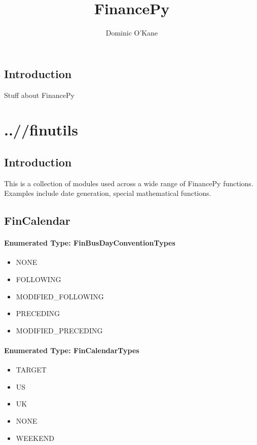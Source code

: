 \documentclass[twoside,11pt]{book}
\begin{document}
\title{{\Huge \bf FinancePy}}
\author{Dominic O'Kane}

\maketitle 

\cleardoublepage

\setcounter{tocdepth}{1}
\tableofcontents

\setcounter{page}{1}

\section{Introduction}
Stuff about FinancePy
\chapter{..//finutils}
\section{Introduction}
This is a collection of modules used across a wide range of FinancePy functions. Examples include date generation, special mathematical functions.
\newpage
\section{FinCalendar}

\subsubsection{Enumerated Type: FinBusDayConventionTypes}
\begin{itemize}
\item{NONE}
\item{FOLLOWING}
\item{MODIFIED\_FOLLOWING}
\item{PRECEDING}
\item{MODIFIED\_PRECEDING}
\end{itemize}

\subsubsection{Enumerated Type: FinCalendarTypes}
\begin{itemize}
\item{TARGET}
\item{US}
\item{UK}
\item{NONE}
\item{WEEKEND}
\end{itemize}
\end{document}
